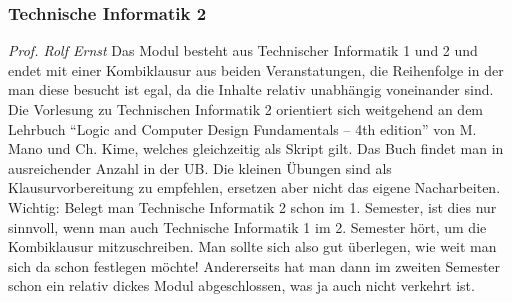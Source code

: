 
\subsubsection{Technische Informatik 2}
	\textit{Prof. Rolf Ernst}
	Das Modul besteht aus Technischer Informatik 1 und 2 und endet
	mit einer Kombiklausur aus beiden Veranstatungen, die
	Reihenfolge in der man diese besucht ist egal, da die
	Inhalte relativ unabhängig voneinander sind.
	Die Vorlesung zu Technischen Informatik 2 orientiert sich
	weitgehend an dem Lehrbuch \enquote{Logic and Computer Design
	Fundamentals – 4th edition} von M. Mano und Ch. Kime, welches
	gleichzeitig als Skript gilt. Das Buch findet man in
	ausreichender Anzahl in der UB. Die kleinen Übungen sind als
	Klausurvorbereitung zu empfehlen, ersetzen aber nicht das eigene
	Nacharbeiten. Wichtig: Belegt man Technische Informatik 2 schon
	im 1. Semester, ist dies nur sinnvoll, wenn man auch Technische
	Informatik 1 im 2. Semester hört, um die Kombiklausur
	mitzuschreiben. Man sollte sich also gut überlegen, wie weit man
	sich da schon festlegen möchte! Andererseits hat man dann im
	zweiten Semester schon ein relativ dickes Modul abgeschlossen,
	was ja auch nicht verkehrt ist.